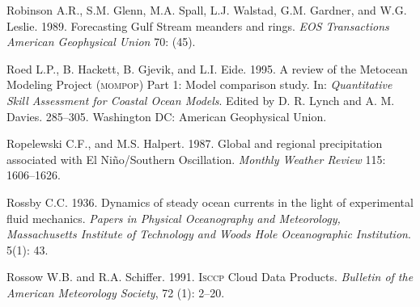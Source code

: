 \begin{thebibliography}{999}
Robinson A.R., S.M. Glenn, M.A. Spall, L.J. Walstad, G.M. Gardner, and
W.G. Leslie. 1989. Forecasting Gulf Stream meanders and
rings. \textit{EOS Transactions American Geophysical Union} 70: (45).
%

Roed L.P., B. Hackett, B. Gjevik, and L.I. Eide.  1995. A review of
the Metocean Modeling Project (\textsc{mompop}) Part 1: Model
comparison study. In: \textit{Quantitative Skill Assessment for
  Coastal Ocean Models}. Edited by D. R. Lynch and
A. M. Davies. 285--305. Washington DC: American Geophysical Union.
%

Ropelewski C.F., and M.S. Halpert.  1987. Global and regional
precipitation associated with El Ni\~{n}o/Southern
Oscillation. \textit{Monthly Weather Review} 115: 1606--1626.
%

Rossby C.C.  1936. Dynamics of steady ocean currents in the light of
experimental fluid mechanics. \textit{Papers in Physical Oceanography
  and Meteorology, Massachusetts Institute of Technology and Woods
  Hole Oceanographic Institution}. 5(1): 43.
%

Rossow W.B. and R.A. Schiffer.  1991. \textsc{Isccp} Cloud Data
Products. \textit{Bulletin of the American Meteorology Society}, 72
(1): 2--20.
%


\end{thebibliography}
